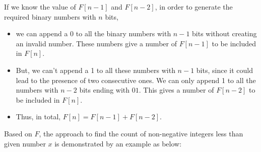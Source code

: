 If we know the value of $F[n−1]$ and $F[n-2]$, in order to generate the required binary numbers with $n$ bits, 
\begin{itemize}
\item we can append a 0 to all the binary numbers with $n-1$ bits without creating an invalid number. These numbers give a number of $F[n−1]$ to be included in $F[n]$.
\item But, we can't append a 1 to all these numbers with $n-1$ bits, since it could lead to the presence of two consecutive ones. We can only append 1 to all the numbers with $n-2$ bits ending with $01$. This gives a number of $F[n−2]$ to be included in $F[n]$. 
\item Thus, in total, $F[n]=F[n−1]+F[n−2]$.
\end{itemize}
Based on $F$, the approach to find the count of non-negative integers less than given number $x$ is demonstrated by an example as below:
